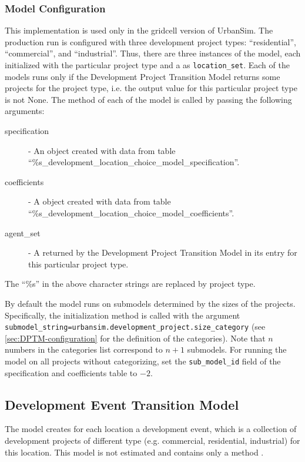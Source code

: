 \subsubsection{Model Configuration}
\modelsindex
%
This implementation is used only in the gridcell version of UrbanSim.
The production run is configured with three development project
types: ``residential'', ``commercial'', and ``industrial''. Thus, there are
three instances of the model, \modelsindex each initialized with the particular project
type and a  as \verb|location_set|.  Each of the models \modelsindex
runs only if the Development Project Transition Model \modelsindex returns some projects
for the project type, i.e. the output value for this particular project type
is not None.  The  method of each of the model \modelsindex is called by
passing the following arguments:
\begin{description}
\item[specification] - An
 object created with data from table
``\%s_development_location_choice_model_specification''.  \modelsindex
\item[coefficients] \coefficientsindex - A  \coefficientsindex object created
with data from table ``\%s_development_location_choice_model_coefficients''. \coefficientsindex\modelsindex
\item[agent_set] - A  returned by the Development
  Project Transition Model \modelsindex in its entry for this particular project type.
\end{description}
The ``\%s'' in the above character strings are replaced by project type.

By default the model runs on submodels determined by the sizes of the projects. Specifically,
the initialization method is called with the argument \verb|submodel_string=urbansim.development_project.size_category|
(see \ref{sec:DPTM-configuration} for the definition of the categories). Note that $n$ numbers in
the categories list correspond to $n+1$ submodels. For running the model on all projects without categorizing, 
set the \verb|sub_model_id| field of the specification and coefficients table to $-2$.

%
\subsection{Development Event Transition Model}
\modelsindex
%
\label{sec:development-event-transition-model}
%
The model \modelsindex {} creates for each location a development event, which is a collection
of development projects of different type (e.g. commercial, residential,
industrial) for this location. This model \modelsindex is not estimated and contains only a
method .

